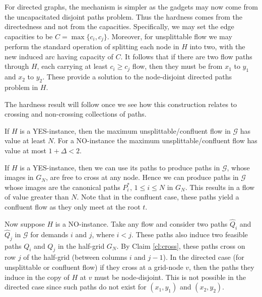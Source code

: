 \documentclass[12pt]{article}
\newcommand{\capp}[1]{c_{#1}}
\begin{document}
For directed graphs, the mechanism is simpler as the gadgets may now come from the
uncapacitated disjoint paths problem. Thus the hardness comes from the directedness and not from the capacities.
Specifically, we may set the edge capacities to be $C=\max\{\capp{i},\capp{j}\}$. Moreover, for unsplittable flow we may
perform the standard operation of splitting each node in $H$ into two, with
 the new induced arc having capacity of $C$. It follows that if there are two flow paths through $H$, each carrying at
 least $\capp{i} \geq \capp{j}$ flow, then they must be from $x_1$ to $y_1$ and $x_2$ to $y_2$.
 These provide a solution to the node-disjoint directed paths problem in $H$.















The hardness result will follow once we see how this construction relates to
crossing and non-crossing collections of paths.

\begin{lemma}\label{lem:yes}
If $H$ is a YES-instance, then the maximum unsplittable/confluent flow in
$\mathcal{G}$ has value at least $N$.  For a NO-instance the
maximum unsplittable/confluent flow has value at most $1+\Delta < 2$.
\end{lemma}
  If $H$ is a YES-instance, then we can use its paths to produce
paths in $\mathcal{G}$, whose images in $G_N$,   are free to cross at any node.
Hence we can produce paths in $\mathcal{G}$ whose images are
the canonical paths $P^*_i, \, 1 \le i \le N$ in $G_N$.
This results in   a flow of value greater than
$N$.  Note that  in the confluent case, these paths yield
 a confluent flow as they only  meet at the root $t$.

Now suppose $H$ is a NO-instance.
Take any flow and consider two paths $\hat{Q}_i$ and $\hat{Q}_j$ in $\mathcal {G}$ for demands $i$ and $j$, where $i < j$.
These paths also induce two feasible paths $Q_i$ and $Q_j$ in the half-grid $G_N$.
By Claim \ref{cl:cross}, these paths cross on row $j$ of the half-grid (between columns $i$ and $j-1$).
In the directed case (for unsplittable or confluent flow) if they cross at a grid-node $v$, then the paths they induce in the copy of $H$ at $v$
must be node-disjoint. This is not possible in the directed case since
such paths do not exist for $(x_1,y_1)$ and $(x_2,y_2)$.
\end{document}
